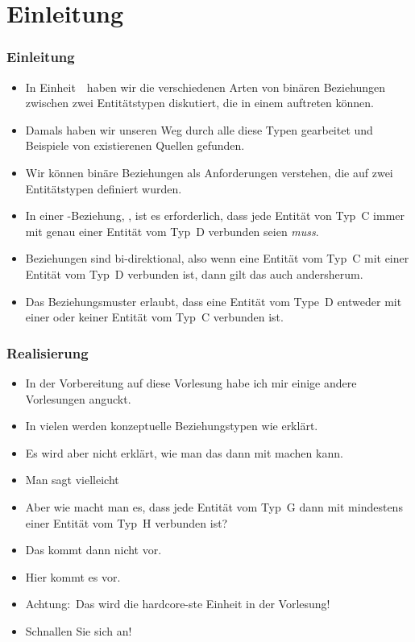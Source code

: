 \documentclass[aspectratio=169,mathserif,notheorems]{beamer}%
\subtitle{37.~Logisches Schema:~Beziehungen}%
\begin{document}
%
%
%
%
\startPresentation%
%
\section{Einleitung}%
%
\begin{frame}%
\frametitle{Einleitung}%
\begin{itemize}%
%
\item In Einheit~\unitRelationshipCardinalities\ haben wir die verschiedenen Arten von binären Beziehungen zwischen zwei Entitätstypen diskutiert, die in einem  auftreten können.%
%
\item<2-> Damals haben wir unseren Weg durch alle diese Typen gearbeitet und Beispiele von existierenen Quellen gefunden.%
%
\item<3-> Wir können binäre Beziehungen als Anforderungen verstehen, die auf zwei Entitätstypen definiert wurden.%
%
\item<4-> In einer -Beziehung, \DEzB, ist es erforderlich, dass jede Entität von Typ~C immer mit genau einer Entität vom Typ~D verbunden seien \emph{muss}.%
%
\item<5-> Beziehungen sind bi-direktional, also wenn eine Entität vom Typ~C mit einer Entität vom Typ~D verbunden ist, dann gilt das auch andersherum.%
%
\item<6-> Das Beziehungsmuster  erlaubt, dass eine Entität vom Type~D entweder mit einer oder keiner Entität vom Typ~C verbunden ist.%
%
\end{itemize}%
\end{frame}%
%
\begin{frame}%
\frametitle{Realisierung}%
\begin{itemize}%
%
\item In der Vorbereitung auf diese Vorlesung habe ich mir einige andere Vorlesungen anguckt.%
%
\item<2-> In vielen werden konzeptuelle Beziehungstypen wie  erklärt.%
%
\item<3-> Es wird aber nicht erklärt, wie man das dann mit  machen kann.%
%
\item<4-> Man sagt vielleicht %
%
\item<5-> Aber wie macht man es, dass jede Entität vom Typ~G dann mit mindestens einer Entität vom Typ~H verbunden ist?%
%
\item<6-> Das kommt dann nicht vor.%
%
\item<7-> Hier kommt es vor.%
%
\item<8-> Achtung:~\alert{Das wird die hardcore-ste Einheit in der Vorlesung!}%
%
\item<9-> \alert{Schnallen Sie sich an!}%
\end{itemize}%
\end{frame}%
\end{document}
